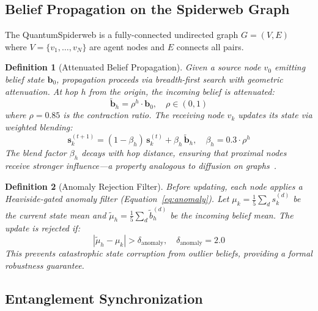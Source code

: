 \documentclass[11pt,a4paper]{article}
\newtheorem{definition}{Definition}[section]
\begin{document}
\subsection{Belief Propagation on the Spiderweb Graph}

The QuantumSpiderweb is a fully-connected undirected graph $G = (V, E)$ where $V = \{v_1, \ldots, v_N\}$ are agent nodes and $E$ connects all pairs.

\begin{definition}[Attenuated Belief Propagation]
Given a source node $v_0$ emitting belief state $\mathbf{b}_0$, propagation proceeds via breadth-first search with geometric attenuation. At hop $h$ from the origin, the incoming belief is attenuated:
\begin{equation}
  \tilde{\mathbf{b}}_h = \rho^h \cdot \mathbf{b}_0, \quad \rho \in (0, 1)
  \label{eq:attenuation}
\end{equation}
where $\rho = 0.85$ is the contraction ratio. The receiving node $v_k$ updates its state via weighted blending:
\begin{equation}
  \mathbf{s}_k^{(t+1)} = (1 - \beta_h)\,\mathbf{s}_k^{(t)} + \beta_h\,\tilde{\mathbf{b}}_h, \quad \beta_h = 0.3 \cdot \rho^h
  \label{eq:belief_blend}
\end{equation}
The blend factor $\beta_h$ decays with hop distance, ensuring that proximal nodes receive stronger influence---a property analogous to diffusion on graphs~\citep{olfatisaber2007consensus}.
\end{definition}

\begin{definition}[Anomaly Rejection Filter]
Before updating, each node applies a Heaviside-gated anomaly filter (Equation~\ref{eq:anomaly}). Let $\mu_k = \frac{1}{5}\sum_d s_k^{(d)}$ be the current state mean and $\tilde{\mu}_h = \frac{1}{5}\sum_d \tilde{b}_h^{(d)}$ be the incoming belief mean. The update is rejected if:
\begin{equation}
  |\tilde{\mu}_h - \mu_k| > \delta_{\text{anomaly}}, \quad \delta_{\text{anomaly}} = 2.0
  \label{eq:anomaly_formal}
\end{equation}
This prevents catastrophic state corruption from outlier beliefs, providing a formal robustness guarantee.
\end{definition}

\subsection{Entanglement Synchronization}
\end{document}
